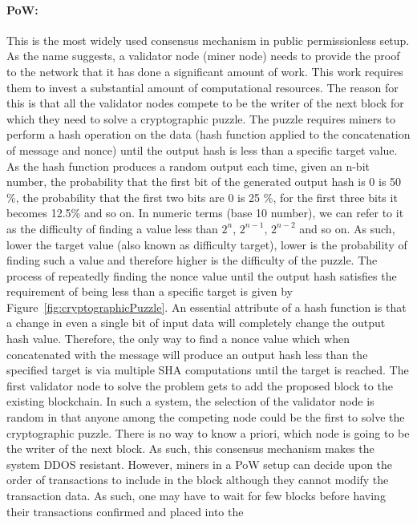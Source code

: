 \paragraph{\ac{PoW}:}This is the most widely used consensus mechanism in public
permissionless setup. As the name suggests, a validator node (miner node) needs
to provide the proof to the network that it has done a significant amount of
work.  This work requires them to invest a substantial amount of computational
resources. The reason for this is that all the validator nodes compete to be
the writer of the next block for which they need to solve a cryptographic
puzzle. The puzzle requires miners to perform a hash operation on the data
(hash function applied to the concatenation of message and nonce) until the
output hash is less than a specific target value. As the hash function produces
a random output each time, given an n-bit number, the probability that the
first bit of the generated output hash is 0 is 50 \%, the probability that the
first two bits are 0 is 25 \%, for the first three bits it becomes 12.5\% and
so on. In numeric terms (base 10 number), we can refer to it as the difficulty
of finding a value less than $2^{n}$, $2^{n-1}$, $2^{n-2}$ and so on. As such,
lower the target value (also known as difficulty target), lower is the
probability of finding such a value and therefore higher is the difficulty of
the puzzle. The process of repeatedly finding the nonce value until the output
hash satisfies the requirement of being less than a specific target is given by
Figure~\ref{fig:cryptographicPuzzle}. An essential attribute of a hash function
is that a change in even a single bit of input data will completely change the
output hash value.  Therefore, the only way to find a nonce value which when
concatenated with the message will produce an output hash less than the
specified target is via multiple SHA computations until the target is reached.
The first validator node to solve the problem gets to add the proposed block to
the existing blockchain.  In such a system, the selection of the validator node
is random in that anyone among the competing node could be the first to solve
the cryptographic puzzle.  There is no way to know a priori, which node is
going to be the writer of the next block. As such, this consensus mechanism
makes the system DDOS resistant.  However, miners in a \ac{PoW} setup can
decide upon the order of transactions to include in the block although they
cannot modify the transaction data. As such, one may have to wait for few
blocks before having their transactions confirmed and placed into the
